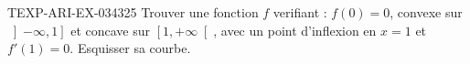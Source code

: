 \begin{exercice}{TEXP-ARI-EX-034}{3}{25}
Trouver une fonction $f$ verifiant : $f(0)=0$, convexe sur $\left]-\infty, 1\right]$ et concave sur $\left[1, +\infty\right[$, avec un point d'inflexion en $x=1$ et $f'(1)=0$. Esquisser sa courbe.

\end{exercice}
